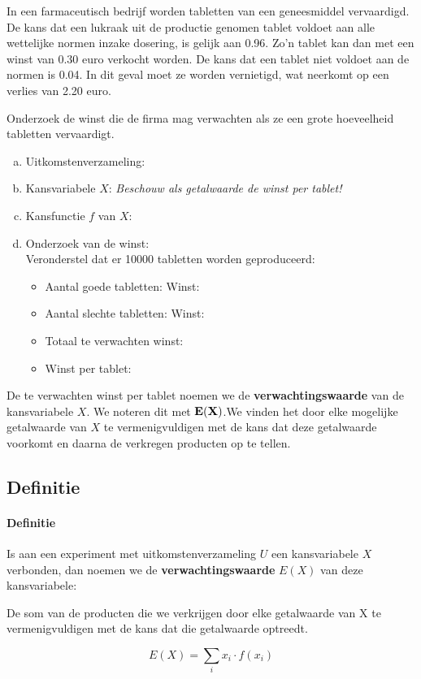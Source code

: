 \documentclass[12pt,twoside]{article}
\begin{document}
\begin{oefening}
In een farmaceutisch bedrijf worden tabletten van een geneesmiddel vervaardigd. De kans dat een lukraak uit de productie genomen tablet voldoet aan alle wettelijke normen inzake dosering, is gelijk aan 0.96. Zo’n tablet kan dan met een winst van 0.30 euro verkocht worden. De kans dat een tablet niet voldoet aan de normen is 0.04. In dit geval moet ze worden vernietigd, wat neerkomt op een verlies van 2.20 euro.

Onderzoek de winst die de firma mag verwachten als ze een grote hoeveelheid tabletten vervaardigt.

\begin{enumerate}[(a)]
  \item Uitkomstenverzameling: \arulefill
  \item Kansvariabele $X$: {\em Beschouw als getalwaarde de winst per tablet!}
  \item Kansfunctie $f$ van $X$: \arulefill
  \item Onderzoek van de winst:\\
  Veronderstel dat er 10000 tabletten worden geproduceerd:\\
  \begin{itemize}
    \itemsep1em
    \item Aantal goede tabletten: \arule{2cm} \hfill Winst: \arule{2cm}
    \item Aantal slechte tabletten: \arule{2cm} \hfill Winst: \arule{2cm}
    \item Totaal te verwachten winst: \arule{2cm}
    \item Winst per tablet: \arule{2cm}
  \end{itemize}
\end{enumerate}
\end{oefening}

De te verwachten winst per tablet noemen we de {\bf verwachtingswaarde} van de kansvariabele $X$. We noteren dit met $\bf E(X)$.We vinden het door elke mogelijke getalwaarde van $X$ te vermenigvuldigen met de kans dat deze getalwaarde voorkomt en daarna de verkregen producten op te tellen.

\subsection{Definitie}
\paragraph*{Definitie}
\begin{mdframed}
Is aan een experiment met uitkomstenverzameling $U$ een kansvariabele $X$ verbonden, dan noemen we de {\bf verwachtingswaarde} $E(X)$ van deze kansvariabele:

De som van de producten die we verkrijgen door elke getalwaarde van X te vermenigvuldigen met de kans dat die getalwaarde optreedt.

$$E(X)=\sum_i x_i\cdot f(x_i)$$
\end{mdframed}
\end{document}
